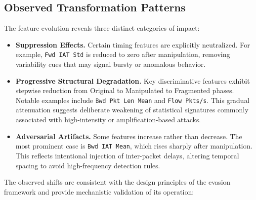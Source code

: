 \subsection{Observed Transformation Patterns}

The feature evolution reveals three distinct categories of impact:

\begin{itemize}
    \item \textbf{Suppression Effects.}  
    Certain timing features are explicitly neutralized. For example, \texttt{Fwd IAT Std} is reduced to zero after manipulation, removing variability cues that may signal bursty or anomalous behavior.

    \item \textbf{Progressive Structural Degradation.}  
    Key discriminative features exhibit stepwise reduction from Original to Manipulated to Fragmented phases. Notable examples include \texttt{Bwd Pkt Len Mean} and \texttt{Flow Pkts/s}. This gradual attenuation suggests deliberate weakening of statistical signatures commonly associated with high-intensity or amplification-based attacks.

    \item \textbf{Adversarial Artifacts.}  
    Some features increase rather than decrease. The most prominent case is \texttt{Bwd IAT Mean}, which rises sharply after manipulation. This reflects intentional injection of inter-packet delays, altering temporal spacing to avoid high-frequency detection rules.
\end{itemize}

The observed shifts are consistent with the design principles of the evasion framework and provide mechanistic validation of its operation:

